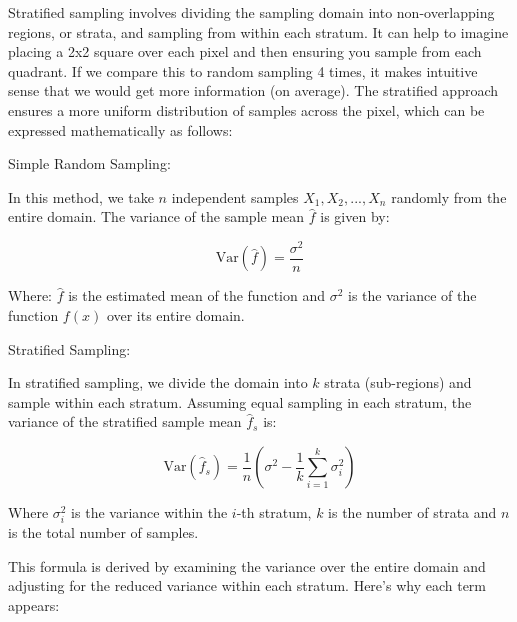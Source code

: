 \documentclass[12pt]{article}
\begin{document}
Stratified sampling involves dividing the sampling domain into non-overlapping regions, or strata, and sampling from within each stratum. It can help to imagine placing a 2x2 square over each pixel and then ensuring you sample from each quadrant. If we compare this to random sampling 4 times, it makes intuitive sense that we would get more information (on average).
The stratified approach ensures a more uniform distribution of samples across the pixel, which can be expressed mathematically as follows:

Simple Random Sampling:

In this method, we take $n$ independent samples $X_1, X_2, ..., X_n$ randomly from the entire domain. The variance of the sample mean $\hat{f}$ is given by:

\[
    \text{Var}(\hat{f}) = \frac{\sigma^2}{n}
\]

Where:
$\hat{f}$ is the estimated mean of the function and $\sigma^2$ is the variance of the function $f(x)$ over its entire domain.

Stratified Sampling:

In stratified sampling, we divide the domain into $k$ strata (sub-regions) and sample within each stratum. Assuming equal sampling in each stratum, the variance of the stratified sample mean $\hat{f}_s$ is:

\[
    \text{Var}(\hat{f}_s) = \frac{1}{n} \left( \sigma^2 - \frac{1}{k} \sum_{i=1}^k \sigma_i^2 \right)
\]

Where $\sigma_i^2$ is the variance within the $i$-th stratum, $k$ is the number of strata and $n$ is the total number of samples.

This formula is derived by examining the variance over the entire domain and adjusting for the reduced variance within each stratum. Here’s why each term appears:
\end{document}
